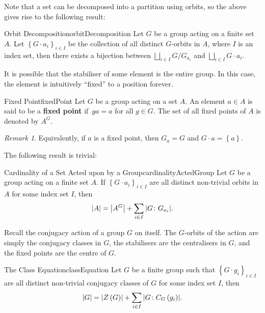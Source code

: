 \documentclass[math]{amznotes}
\theoremstyle{remark}
\newtheorem*{remark}{Remark}
\newcommand{\0}{\mathbf{0}}
\newcommand{\1}{\mathbf{1}}
\begin{document}
Note that a set can be decomposed into a partition using orbits, so the above gives rise to the following result:
\begin{corbox}{Orbit Decomposition}{orbitDecomposition}
    Let $G$ be a group acting on a finite set $A$. Let $\left\{G \cdot a_i\right\}_{i \in I}$ be the collection of all distinct $G$-orbits in $A$, where $I$ is an index set, then there exists a bijection between $\bigsqcup_{i \in I}G \slash G_{a_i}$ and $\bigsqcup_{i \in I}G \cdot a_i$.
\end{corbox}
It is possible that the stabiliser of some element is the entire group. In this case, the element is intuitively ``fixed'' to a position forever.
\begin{dfnbox}{Fixed Point}{fixedPoint}
    Let $G$ be a group acting on a set $A$. An element $a \in A$ is said to be a {\color{red} \textbf{fixed point}} if~$ga = a$ for all $g \in G$. The set of all fixed points of $A$ is denoted by $A^G$.
\end{dfnbox}
\begin{notebox}
    \begin{remark}
        Equivalently, if $a$ is a fixed point, then $G_a = G$ and $G \cdot a = \left\{a\right\}$.
    \end{remark}
\end{notebox}
The following result is trivial:
\begin{probox}{Cardinality of a Set Acted upon by a Group}{cardinalityActedGroup}
    Let $G$ be a group acting on a finite set $A$. If $\left\{G \cdot a_i\right\}_{i \in I}$ are all distinct non-trivial orbits in $A$ for some index set $I$, then 
    \begin{equation*}
        {\left\lvert {A} \right\rvert} = {\left\lvert {A^G} \right\rvert} + \sum_{i \in I}{\left\lvert {G \colon G_{a_i}} \right\rvert}.
    \end{equation*}
\end{probox}
Recall the conjugacy action of a group $G$ on itself. The $G$-orbits of the action are simply the conjugacy classes in $G$, the stabilisers are the centralisers in $G$, and the fixed points are the centre of $G$. 
\begin{thmbox}{The Class Equation}{classEquation}
    Let $G$ be a finite group such that $\left\{G \cdot g_i\right\}_{i \in I}$ are all distinct non-trivial conjugacy classes of $G$ for some index set $I$, then 
    \begin{equation*}
        {\left\lvert {G} \right\rvert} = {\left\lvert {Z\left(G\right)} \right\rvert} + \sum_{i \in I}{\left\lvert {G \colon C_G\left(g_i\right)} \right\rvert}.
    \end{equation*}
\end{thmbox}
\end{document}
